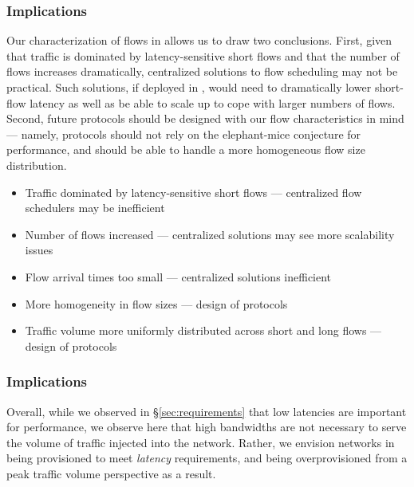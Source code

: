 
    


\subsubsection{Implications}
Our characterization of flows in \dis allows us to draw two conclusions. First, given that \dis traffic is dominated by latency-sensitive short flows and that the number of flows increases dramatically, centralized solutions to flow scheduling may not be practical. Such solutions, if deployed in \dis, would need to dramatically lower short-flow latency as well as be able to scale up to cope with larger numbers of flows. Second, future protocols should be designed with our flow characteristics in mind --- namely, protocols should not rely on the elephant-mice conjecture for performance, and should be able to handle a more homogeneous flow size distribution. 

\begin{itemize}[leftmargin=*]
	\itemsep0em
	\item Traffic dominated by latency-sensitive short flows --- centralized flow schedulers may be inefficient
	\item Number of flows increased --- centralized solutions may see more scalability issues
	\item {} Flow arrival times too small --- centralized solutions inefficient
	\item More homogeneity in flow sizes --- design of protocols
	\item Traffic volume more uniformly distributed across short and long flows --- design of protocols
\end{itemize}


\subsubsection{Implications}
\label{ssec:implications}
Overall, while we observed in \S\ref{sec:requirements} that low latencies are important for performance, we observe here that high bandwidths are not necessary to serve the volume of traffic injected into the network. Rather, we envision networks in \ddc being provisioned to meet \emph{latency} requirements, and being overprovisioned from a peak traffic volume perspective as a result.  

